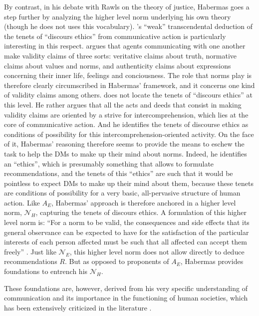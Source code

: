 \documentclass[preprint, french, english, 11pt, authoryear]{elsarticle}%
\begin{document}
By contrast, in his debate with Rawls on the theory of justice, Habermas goes a step further by analyzing the higher level norm underlying his own theory (though he does not uses this vocabulary). \cite{habermas_moralbewustsein_1983}'s “weak” transcendental deduction of the tenets of “discours ethics” from communicative action is particularly interesting in this respect. \citet{habermas_theorie_1981} argues that agents communicating with one another make validity claims of three sorts: veritative claims about truth, normative claims about values and norms, and authenticity claims about expressions concerning their inner life, feelings and conciousness. The role that norms play is therefore clearly circumscribed in Habermas' framework, and it concerns one kind of validity claims among others. \cite{habermas_moralbewustsein_1983} does not locate the tenets of “discours ethics” at this level. He rather argues that all the acts and deeds that consist in making validity claims are oriented by a strive for intercomprehension, which lies at the core of communicative action. And he identifies the tenets of discourse ethics as conditions of possibility for this intercomprehension-oriented activity. On the face of it, Habermas' reasoning therefore seems to provide the means to eschew the task to help the \acp{DM} to make up their mind about norms. Indeed, he identifies an “ethics”, which is presumably something that allows to formulate recommendations, and the tenets of this “ethics” are such that it would be pointless to expect \acp{DM} to make up their mind about them, because these tenets are conditions of possibility for a very basic, all-pervasive structure of human action. Like $A_E$, Habermas' approach is therefore anchored in a higher level norm, $\mathscr{N}_{H}$, capturing the tenets of discours ethics. A formulation of this higher level norm is: “For a norm to be valid, the consequences and side effects that its general observance can be expected to have for the satisfaction of the particular interests of each person affected must be such that all affected can accept them freely” \citep{habermas_moralbewustsein_1983}. Just like $\mathscr{N}_E$, this higher level norm does not allow directly to deduce recommendations $R$. But as opposed to proponents of $A_E$, Habermas provides foundations to entrench his $\mathscr{N}_{H}$. 

These foundations are, however, derived from his very specific understanding of communication and its importance in the functioning of human societies, which has been extensively criticized in the literature \citep{heath_communicative_2001,honneth_kritik_1985,benhabib_situating_1992}. 
\end{document}
